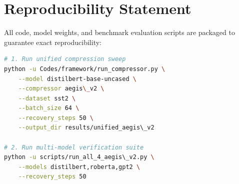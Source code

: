 \section{Reproducibility Statement}
All code, model weights, and benchmark evaluation scripts are packaged to guarantee exact reproducibility:
\begin{lstlisting}[language=bash]
# 1. Run unified compression sweep
python -u Codes/framework/run_compressor.py \
    --model distilbert-base-uncased \
    --compressor aegis\_v2 \
    --dataset sst2 \
    --batch_size 64 \
    --recovery_steps 50 \
    --output_dir results/unified_aegis\_v2

# 2. Run multi-model verification suite
python -u scripts/run_all_4_aegis\_v2.py \
    --models distilbert,roberta,gpt2 \
    --recovery_steps 50
\end{lstlisting}
